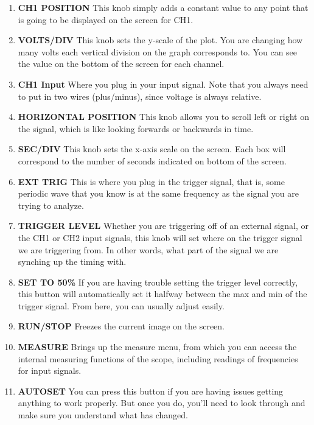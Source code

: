 \begin{enumerate}

\item \textbf{CH1 POSITION} This knob simply adds a constant value to any point that is going to be displayed on the screen for CH1. 
\item \textbf{VOLTS/DIV} This knob sets the y-scale of the plot. You are changing how many volts each vertical division on the graph corresponds to. You can see the value on the bottom of the screen for each channel.
\item \textbf{CH1 Input}  Where you plug in your input signal. Note that you always need to put in two wires (plus/minus), since voltage is always relative. 
\item \textbf{HORIZONTAL POSITION} This knob allows you to scroll left or right on the signal, which is like looking forwards or backwards in time.
\item \textbf{SEC/DIV} This knob sets the x-axis scale on the screen. Each box will correspond to the number of seconds indicated on bottom of the screen. 
\item \textbf{EXT TRIG} This is where you plug in the trigger signal, that is, some periodic wave that you know is at the same frequency as the signal you are trying to analyze.
\item \textbf{TRIGGER LEVEL} Whether you are triggering off of an external signal, or the CH1 or CH2 input signals, this knob will set where on the trigger signal we are triggering from. In other words, what part of the signal we are synching up the timing with.
\item \textbf{SET TO 50\%} If you are having trouble setting the trigger level correctly, this button will automatically set it halfway between the max and min of the trigger signal. From here, you can usually adjust easily.
\item \textbf{RUN/STOP} Freezes the current image on the screen.
\item \textbf{MEASURE} Brings up the measure menu, from which you can access the internal measuring functions of the scope, including readings of frequencies for input signals.
\item \textbf{AUTOSET} You can press this button if you are having issues getting anything to work properly. But once you do, you'll need to look through and make sure you understand what has changed. 
\end{enumerate}

